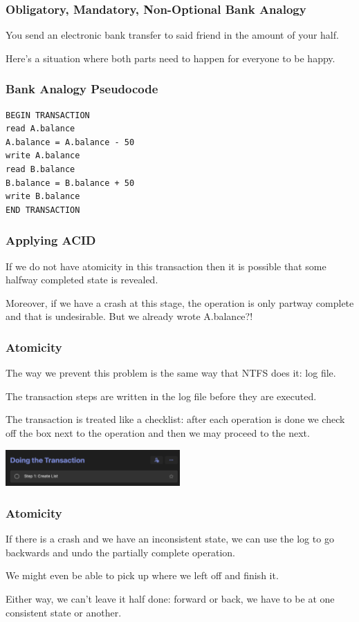 \begin{frame}
\frametitle{Obligatory, Mandatory, Non-Optional Bank Analogy}
You send an electronic bank transfer to said friend in the amount of your half.  

Here's a situation where both parts need to happen for everyone to be happy. 

\end{frame}

\begin{frame}[fragile]
\frametitle{Bank Analogy Pseudocode}

\begin{verbatim}
BEGIN TRANSACTION
read A.balance
A.balance = A.balance - 50
write A.balance
read B.balance
B.balance = B.balance + 50
write B.balance
END TRANSACTION
\end{verbatim}

\end{frame}

\begin{frame}
\frametitle{Applying ACID}
If we do not have atomicity in this transaction then it is possible that some halfway completed state is revealed.

Moreover, if we have a crash at this stage, the operation is only partway complete and that is undesirable. But we already wrote A.balance?!

\end{frame}


\begin{frame}
\frametitle{Atomicity}

The way we prevent this problem is the same way that NTFS does it: log file. 

The transaction steps are written in the log file before they are executed. 

The transaction is treated like a checklist: after each operation is done we check off the box next to the operation and then we may proceed to the next. 

\begin{center}
	\includegraphics[width=0.5\textwidth]{images/step1.png}
\end{center}

\end{frame}


\begin{frame}
\frametitle{Atomicity}

If there is a crash and we have an inconsistent state, we can use the log to go backwards and undo the partially complete operation.

We might even be able to pick up where we left off and finish it. 

Either way, we can't leave it half done: forward or back, we have to be at one consistent state or another.


\end{frame}

